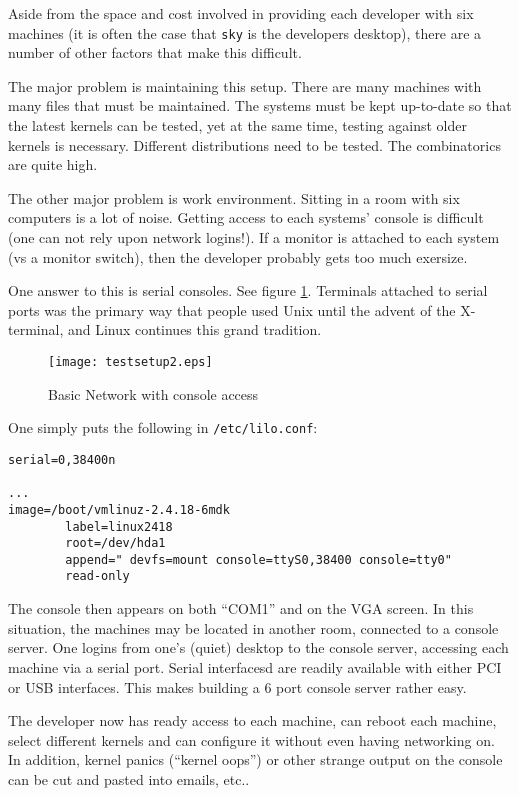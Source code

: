 Aside from the space and cost involved in providing each developer with six
machines (it is often the case that {\tt sky} is the developers desktop),
there are a number of other factors that make this difficult.  

The major problem is maintaining this setup. There are many machines with
many files that must be maintained. The systems must be kept up-to-date so
that the latest kernels can be tested, yet at the same time, testing against
older kernels is necessary. Different distributions need to be tested. The
combinatorics are quite high.

The other major problem is work environment. Sitting in a room with six
computers is a lot of noise. Getting access to each systems' console is
difficult (one can not rely upon network logins!). If a monitor is attached
to each system (vs a monitor switch), then the developer probably gets too
much exersize.

One answer to this is serial consoles. See figure
\ref{basicconsole}. Terminals attached to serial ports was the primary 
way that people used Unix until the advent of the X-terminal, and Linux 
continues this grand tradition.

\begin{figure}[hf]
\texttt{[image: testsetup2.eps]} 
\caption{Basic Network with console access}
\label{basicconsole}
\end{figure}

One simply puts the following in {\tt /etc/lilo.conf}:
\begin{verbatim}
serial=0,38400n

...
image=/boot/vmlinuz-2.4.18-6mdk
        label=linux2418
        root=/dev/hda1
        append=" devfs=mount console=ttyS0,38400 console=tty0"
        read-only

\end{verbatim}

The console then appears on both ``COM1'' and on the VGA screen. In this
situation, the machines may be located in another room, connected to a
console server. One logins from one's (quiet) desktop to the console server,
accessing each machine via a serial port. Serial interfacesd are readily
available with either PCI or USB interfaces. This makes building a 6 port
console server rather easy.

The developer now has ready access to each machine, can reboot each machine,
select different kernels and can configure it without even having networking on.
In addition, kernel panics (``kernel oops'') or other strange output on the
console can be cut and pasted into emails, etc..

